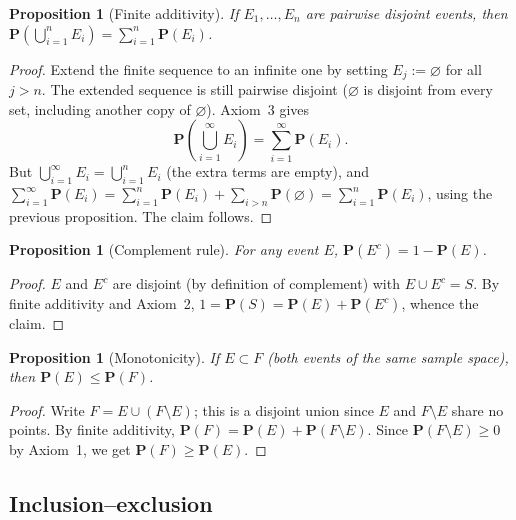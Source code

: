 \documentclass[11pt]{article}
\theoremstyle{definition}
\theoremstyle{plain}
\newtheorem{proposition}[definition]{Proposition}
\theoremstyle{remark}
\begin{document}
\begin{proposition}[Finite additivity]
\label{prop:finite-additivity}
If $E_1, \dots, E_n$ are pairwise disjoint events, then
$\mathbf{P}\left(\bigcup_{i=1}^n E_i\right) = \sum_{i=1}^n \mathbf{P}(E_i)$.
\end{proposition}
\begin{proof}
Extend the finite sequence to an infinite one by setting $E_j := \varnothing$ for all $j > n$. The
extended sequence is still pairwise disjoint ($\varnothing$ is disjoint from every set, including
another copy of $\varnothing$). Axiom~3 gives
\[
\mathbf{P}\left(\bigcup_{i=1}^\infty E_i\right) = \sum_{i=1}^\infty \mathbf{P}(E_i).
\]
But $\bigcup_{i=1}^\infty E_i = \bigcup_{i=1}^n E_i$ (the extra terms are empty), and
$\sum_{i=1}^\infty \mathbf{P}(E_i) = \sum_{i=1}^n \mathbf{P}(E_i) + \sum_{i>n}\mathbf{P}(\varnothing)
= \sum_{i=1}^n \mathbf{P}(E_i)$, using the previous proposition. The claim follows.
\end{proof}

\begin{proposition}[Complement rule]
For any event $E$, $\mathbf{P}(E^c) = 1 - \mathbf{P}(E)$.
\end{proposition}
\begin{proof}
$E$ and $E^c$ are disjoint (by definition of complement) with $E \cup E^c = S$. By finite
additivity and Axiom~2, $1 = \mathbf{P}(S) = \mathbf{P}(E) + \mathbf{P}(E^c)$, whence the claim.
\end{proof}

\begin{proposition}[Monotonicity]
\label{prop:monotone}
If $E \subset F$ (both events of the same sample space), then $\mathbf{P}(E) \le \mathbf{P}(F)$.
\end{proposition}
\begin{proof}
Write $F = E \cup (F\setminus E)$; this is a disjoint union since $E$ and $F \setminus E$ share no
points. By finite additivity, $\mathbf{P}(F) = \mathbf{P}(E) + \mathbf{P}(F\setminus E)$. Since
$\mathbf{P}(F \setminus E) \ge 0$ by Axiom~1, we get $\mathbf{P}(F) \ge \mathbf{P}(E)$.
\end{proof}

\subsection{Inclusion--exclusion}
\end{document}
